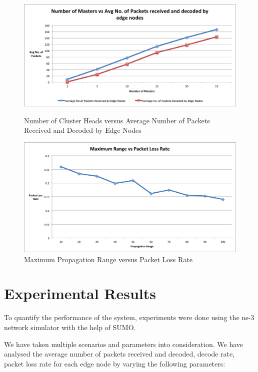\documentclass{acm_proc_article-sp}
\begin{document}
\begin{figure}[ht]
\begin{minipage}[b]{0.50\linewidth}
\centering
\includegraphics[width=\textwidth]{nummasters.png}
\caption{Number of Cluster Heads versus Average Number of Packets Received and Decoded by Edge Nodes}
\label{nummasters}
\end{minipage}
\hspace{0.5cm}
\begin{minipage}[b]{0.50\linewidth}
\centering
\includegraphics[width=\textwidth]{maxrange.png}
\caption{Maximum Propagation Range versus Packet Loss Rate}
\label{maxrange}
\end{minipage}
\end{figure}




\section{Experimental Results}
\vspace{1 mm}

To quantify the performance of the system, experiments were done using the ns-3 network simulator with the help of SUMO. 

We have taken multiple scenarios and parameters into consideration. We have analysed the average number of packets received and decoded, decode rate, packet loss rate for each edge node by varying the following parameters:
\end{document}
